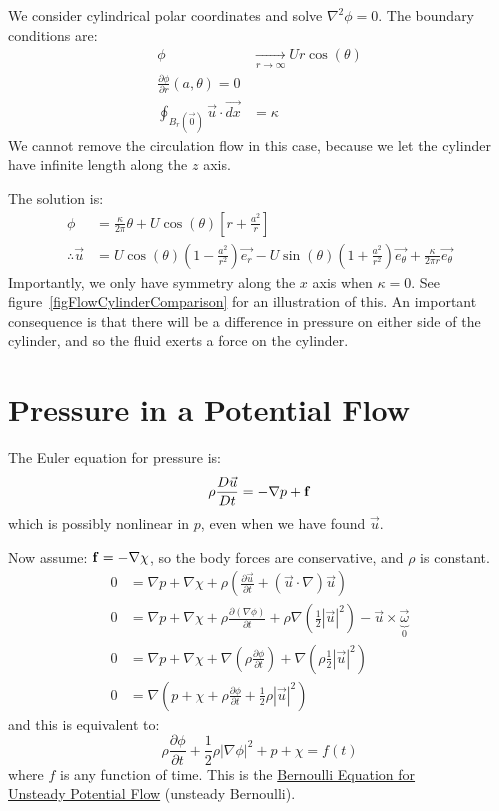 \documentclass[../Main.tex]{subfiles}
\begin{document}
We consider cylindrical polar coordinates and solve $\nabla^2 \phi = 0$. The boundary conditions are:
\begin{align*}
    \phi &\xrightarrow[r \to \infty]{} Ur\cos(\theta) \\
    \frac{\partial \phi}{\partial r}(a, \theta) = 0 \\
    \oint_{B_r(\vec0)} \vec{u} \cdot \vec{dx} &= \kappa
\end{align*}
We cannot remove the circulation flow in this case, because we let the cylinder have infinite length along the $z$ axis.

The solution is:
\begin{align*}
    \phi &= \frac{\kappa}{2\pi}\theta + U\cos(\theta) \left[r + \frac{a^2}{r}\right] \\
    \therefore \vec{u} &= U\cos\left(\theta\right) (1 - \frac{a^2}{r^2}) \vec{e_r} - U\sin(\theta) \left(1 + \frac{a^2}{r^2}\right)\vec{e_\theta} + \frac{\kappa}{2\pi r} \vec{e_\theta}
\end{align*}
Importantly, we only have symmetry along the $x$ axis when $\kappa = 0$. See figure~\ref{figFlowCylinderComparison} for an illustration of this. An important consequence is that there will be a difference in pressure on either side of the cylinder, and so the fluid exerts a force on the cylinder.
\section{Pressure in a Potential Flow}
The Euler equation for pressure is:
\begin{equation*}
    \rho \frac{D \vec{u}}{D t} = - \nabla p + \mathbf{f}
\end{equation*}
which is possibly nonlinear in $p$, even when we have found $\vec{u}$.

Now assume: $\mathbf{f} = - \nabla \chi$, so the body forces are conservative, and $\rho$ is constant.
\begin{align*}
    0 &= \nabla p + \nabla \chi + \rho \left(\frac{\partial \vec{u}}{\partial t} + (\vec{u} \cdot \nabla)\vec{u}\right) \\
    0 &= \nabla p + \nabla \chi + \rho \frac{\partial (\nabla \phi)}{\partial t} + \rho \nabla \left(\frac12 |\vec{u}|^2\right) - \vec{u} \times \underbrace{\vec{\omega}}_{0} \\
    0 &= \nabla p + \nabla \chi + \nabla\left(\rho\frac{\partial \phi}{\partial t}\right) + \nabla \left(\rho\frac12 |\vec{u}|^2\right) \\
    0 &= \nabla\left( p + \chi + \rho\frac{\partial \phi}{\partial t} + \frac12\rho |\vec{u}|^2\right)
\end{align*}
and this is equivalent to:
\begin{equation}
    \rho \frac{\partial \phi}{\partial t} + \frac12 \rho |\nabla \phi|^2 + p + \chi = f(t)
    \label{eqnBernoulliUnsteady}
\end{equation}
where $f$ is any function of time. This is the \underline{Bernoulli Equation for}\\\underline{Unsteady Potential Flow} (unsteady Bernoulli).
\end{document}
